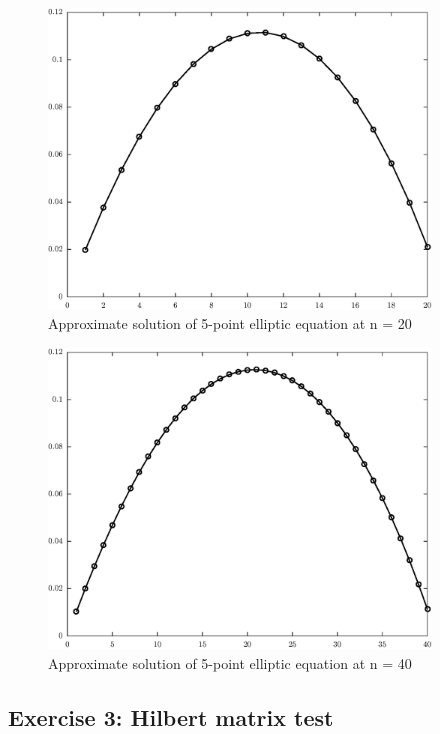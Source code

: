 \documentclass[11pt]{article}
\begin{document}
\begin{figure}[!hbt]
\begin{center}
	\includegraphics[width=4in]{math609_pa1_comp_example_2_n_20.eps}
	\caption{Approximate solution of 5-point elliptic equation at n = 20}
\end{center}
\end{figure}

\begin{figure}[!hbt]
\begin{center}
	\includegraphics[width=4in]{math609_pa1_comp_example_2_n_40.eps}
	\caption{Approximate solution of 5-point elliptic equation at n = 40}
\end{center}
\end{figure}

\subsection{Exercise 3: Hilbert matrix test}
\end{document}
